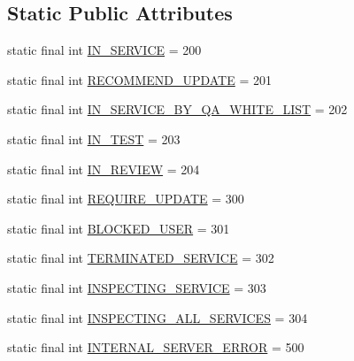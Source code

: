 \subsection*{Static Public Attributes}
\begin{DoxyCompactItemize}
\item 
static final int \hyperlink{classcom_1_1toast_1_1android_1_1gamebase_1_1launching_1_1data_1_1_launching_status_aae596a26b493875f4001dfac6d6b572e}{I\+N\+\_\+\+S\+E\+R\+V\+I\+CE} = 200
\item 
static final int \hyperlink{classcom_1_1toast_1_1android_1_1gamebase_1_1launching_1_1data_1_1_launching_status_a11dabce516910dc589608baee050d7a4}{R\+E\+C\+O\+M\+M\+E\+N\+D\+\_\+\+U\+P\+D\+A\+TE} = 201
\item 
static final int \hyperlink{classcom_1_1toast_1_1android_1_1gamebase_1_1launching_1_1data_1_1_launching_status_ac47752f185e8ef29fd624cff4ac85c9b}{I\+N\+\_\+\+S\+E\+R\+V\+I\+C\+E\+\_\+\+B\+Y\+\_\+\+Q\+A\+\_\+\+W\+H\+I\+T\+E\+\_\+\+L\+I\+ST} = 202
\item 
static final int \hyperlink{classcom_1_1toast_1_1android_1_1gamebase_1_1launching_1_1data_1_1_launching_status_a4e546be9cef44d6320ecd27ba40ccb03}{I\+N\+\_\+\+T\+E\+ST} = 203
\item 
static final int \hyperlink{classcom_1_1toast_1_1android_1_1gamebase_1_1launching_1_1data_1_1_launching_status_a5c2a0cf7049c294e603a7109c8b346b9}{I\+N\+\_\+\+R\+E\+V\+I\+EW} = 204
\item 
static final int \hyperlink{classcom_1_1toast_1_1android_1_1gamebase_1_1launching_1_1data_1_1_launching_status_a8e7d5c64b43393328ec39590715a2282}{R\+E\+Q\+U\+I\+R\+E\+\_\+\+U\+P\+D\+A\+TE} = 300
\item 
static final int \hyperlink{classcom_1_1toast_1_1android_1_1gamebase_1_1launching_1_1data_1_1_launching_status_a0fe4925ebb0a22038ef69af7d05f8b17}{B\+L\+O\+C\+K\+E\+D\+\_\+\+U\+S\+ER} = 301
\item 
static final int \hyperlink{classcom_1_1toast_1_1android_1_1gamebase_1_1launching_1_1data_1_1_launching_status_abec9670d386b7f1b2d009df4ed2d9766}{T\+E\+R\+M\+I\+N\+A\+T\+E\+D\+\_\+\+S\+E\+R\+V\+I\+CE} = 302
\item 
static final int \hyperlink{classcom_1_1toast_1_1android_1_1gamebase_1_1launching_1_1data_1_1_launching_status_af35b82d2dd87ed6ce663218b8f0bbfc9}{I\+N\+S\+P\+E\+C\+T\+I\+N\+G\+\_\+\+S\+E\+R\+V\+I\+CE} = 303
\item 
static final int \hyperlink{classcom_1_1toast_1_1android_1_1gamebase_1_1launching_1_1data_1_1_launching_status_a8c0ef43ca7dd8c8af52fa005c78f1059}{I\+N\+S\+P\+E\+C\+T\+I\+N\+G\+\_\+\+A\+L\+L\+\_\+\+S\+E\+R\+V\+I\+C\+ES} = 304
\item 
static final int \hyperlink{classcom_1_1toast_1_1android_1_1gamebase_1_1launching_1_1data_1_1_launching_status_a474f220979d03fbafc9aa9eb51126f2c}{I\+N\+T\+E\+R\+N\+A\+L\+\_\+\+S\+E\+R\+V\+E\+R\+\_\+\+E\+R\+R\+OR} = 500
\end{DoxyCompactItemize}


